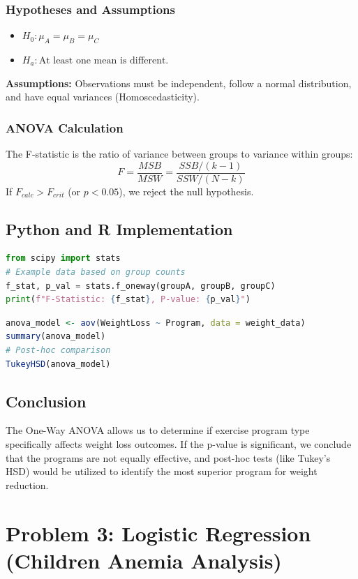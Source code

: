 \documentclass[12pt]{article}
\begin{document}
\subsubsection{Hypotheses and Assumptions}
\begin{itemize}
    \item $H_0: \mu_A = \mu_B = \mu_C$
    \item $H_a: \text{At least one mean is different.}$
\end{itemize}
\textbf{Assumptions:} Observations must be independent, follow a normal distribution, and have equal variances (Homoscedasticity).

\subsubsection{ANOVA Calculation}

The F-statistic is the ratio of variance between groups to variance within groups:
\[ F = \frac{MSB}{MSW} = \frac{SSB/(k-1)}{SSW/(N-k)} \]
If $F_{calc} > F_{crit}$ (or $p < 0.05$), we reject the null hypothesis.

\subsection{Python and R Implementation}
\begin{lstlisting}[language=Python, caption=Python ANOVA for Problem 2]
from scipy import stats
# Example data based on group counts
f_stat, p_val = stats.f_oneway(groupA, groupB, groupC)
print(f"F-Statistic: {f_stat}, P-value: {p_val}")
\end{lstlisting}

\begin{lstlisting}[language=R, caption=R ANOVA for Problem 2]
anova_model <- aov(WeightLoss ~ Program, data = weight_data)
summary(anova_model)
# Post-hoc comparison
TukeyHSD(anova_model)
\end{lstlisting}

\subsection{Conclusion}
The One-Way ANOVA allows us to determine if exercise program type specifically affects weight loss outcomes. If the p-value is significant, we conclude that the programs are not equally effective, and post-hoc tests (like Tukey's HSD) would be utilized to identify the most superior program for weight reduction.


\newpage
\section{Problem 3: Logistic Regression (Children Anemia Analysis)}
\label{prob3}
\end{document}
